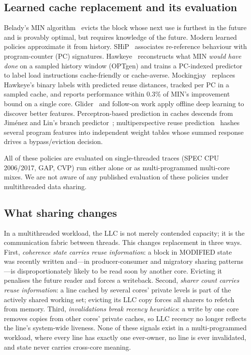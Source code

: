\documentclass[conference]{IEEEtran}
\begin{document}
\subsection{Learned cache replacement and its evaluation}

Belady's MIN algorithm~\cite{belady1966study} evicts the block whose next use is furthest in the future and is provably optimal, but requires knowledge of the future. Modern learned policies approximate it from history. SHiP~\cite{wu2011ship} associates re-reference behaviour with program-counter (PC) signatures. Hawkeye~\cite{jain2016hawkeye} reconstructs what MIN \emph{would have done} on a sampled history window (OPTgen) and trains a PC-indexed predictor to label load instructions cache-friendly or cache-averse. Mockingjay~\cite{shah2022mockingjay} replaces Hawkeye's binary labels with predicted reuse distances, tracked per PC in a sampled cache, and reports performance within 0.3\% of MIN's improvement bound on a single core. Glider~\cite{shi2019glider} and follow-on work apply offline deep learning to discover better features. Perceptron-based prediction in caches descends from Jiménez and Lin's branch predictor~\cite{jimenez2001perceptron}; multiperspective reuse prediction~\cite{jimenez2017multiperspective} hashes several program features into independent weight tables whose summed response drives a bypass/eviction decision.

All of these policies are evaluated on single-threaded traces (SPEC CPU 2006/2017, GAP, CVP) run either alone or as multi-programmed multi-core mixes. We are not aware of any published evaluation of these policies under multithreaded data sharing.

\subsection{What sharing changes}

In a multithreaded workload, the LLC is not merely contended capacity; it is the communication fabric between threads. This changes replacement in three ways. First, \emph{coherence state carries reuse information}: a block in MODIFIED state~\cite{sorin2011coherence} was recently written and---in producer-consumer and migratory sharing patterns---is disproportionately likely to be read soon by another core. Evicting it penalises the future reader and forces a writeback. Second, \emph{sharer count carries reuse information}: a line cached by several cores' private levels is part of the actively shared working set; evicting its LLC copy forces all sharers to refetch from memory. Third, \emph{invalidations break recency heuristics}: a write by one core removes copies from other cores' private caches, so LLC recency no longer reflects the line's system-wide liveness. None of these signals exist in a multi-programmed workload, where every line has exactly one ever-owner, no line is ever invalidated, and state never carries cross-core meaning.
\end{document}
